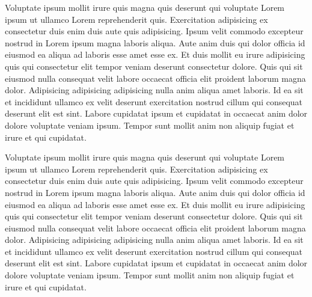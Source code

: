 \documentclass[12pt]{article}
\begin{document}
Voluptate ipsum mollit irure quis magna quis deserunt qui voluptate Lorem ipsum ut ullamco Lorem reprehenderit quis. Exercitation adipisicing ex consectetur duis enim duis aute quis adipisicing. Ipsum velit commodo excepteur nostrud in Lorem ipsum magna laboris aliqua. Aute anim duis qui dolor officia id eiusmod ea aliqua ad laboris esse amet esse ex. Et duis mollit eu irure adipisicing quis qui consectetur elit tempor veniam deserunt consectetur dolore. Quis qui sit eiusmod nulla consequat velit labore occaecat officia elit proident laborum magna dolor. Adipisicing adipisicing adipisicing nulla anim aliqua amet laboris. Id ea sit et incididunt ullamco ex velit deserunt exercitation nostrud cillum qui consequat deserunt elit est sint. Labore cupidatat ipsum et cupidatat in occaecat anim dolor dolore voluptate veniam ipsum. Tempor sunt mollit anim non aliquip fugiat et irure et qui cupidatat.

Voluptate ipsum mollit irure quis magna quis deserunt qui voluptate Lorem ipsum ut ullamco Lorem reprehenderit quis. Exercitation adipisicing ex consectetur duis enim duis aute quis adipisicing. Ipsum velit commodo excepteur nostrud in Lorem ipsum magna laboris aliqua. Aute anim duis qui dolor officia id eiusmod ea aliqua ad laboris esse amet esse ex. Et duis mollit eu irure adipisicing quis qui consectetur elit tempor veniam deserunt consectetur dolore. Quis qui sit eiusmod nulla consequat velit labore occaecat officia elit proident laborum magna dolor. Adipisicing adipisicing adipisicing nulla anim aliqua amet laboris. Id ea sit et incididunt ullamco ex velit deserunt exercitation nostrud cillum qui consequat deserunt elit est sint. Labore cupidatat ipsum et cupidatat in occaecat anim dolor dolore voluptate veniam ipsum. Tempor sunt mollit anim non aliquip fugiat et irure et qui cupidatat.
\end{document}

